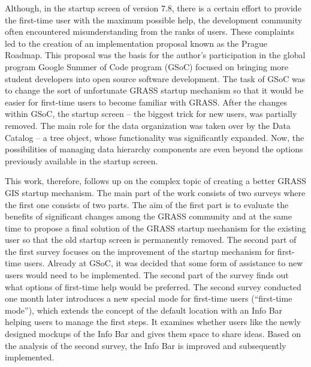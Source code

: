 \documentclass[a4paper,10pt,twoside]{article}
\begin{document}
Although, in the startup screen of version 7.8, there is a certain
effort to provide the first-time user with the maximum possible help,
the development community often encountered misunderstanding from the
ranks of users. These complaints led to the creation of an
implementation proposal known as the Prague Roadmap. This proposal was
the basis for the author's participation in the global program Google
Summer of Code program (GSoC) focused on bringing more student
developers into open source software development. The task of GSoC was
to change the sort of unfortunate GRASS startup mechanism so that it
would be easier for first-time users to become familiar with
GRASS. After the changes within GSoC, the startup screen -- the
biggest trick for new users, was partially removed. The main role for
the data organization was taken over by the Data Catalog -- a tree
object, whose functionality was significantly expanded. Now, the
possibilities of managing data hierarchy components are even beyond
the options previously available in the startup screen.

This work, therefore, follows up on the complex topic of creating a
better GRASS GIS startup mechanism. The main part of the work consists
of two surveys where the first one consists of two parts. The aim of
the first part is to evaluate the benefits of significant changes
among the GRASS community and at the same time to propose a final
solution of the GRASS startup mechanism for the existing user so that
the old startup screen is permanently removed. The second part of the
first survey focuses on the improvement of the startup mechanism for
first-time users. Already at GSoC, it was decided that some form of
assistance to new users would need to be implemented. The second part
of the survey finds out what options of first-time help would be
preferred. The second survey conducted one month later introduces a
new special mode for first-time users (``first-time mode''), which
extends the concept of the default location with an Info Bar helping
users to manage the first steps. It examines whether users like the
newly designed mockups of the Info Bar and gives them space to share
ideas. Based on the analysis of the second survey, the Info Bar is
improved and subsequently implemented.
\end{document}
